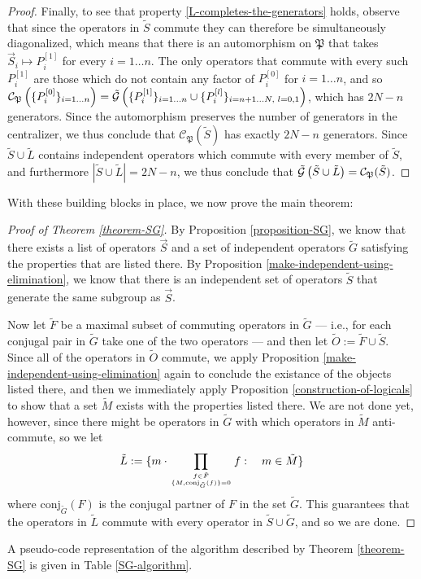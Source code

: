 \documentclass[twocolumn,showpacs,preprintnumbers,amsmath,amssymb,nofootinbib,pra,floatfix]{revtex4-1}
\newenvironment{remark}[1][Remark]{\begin{trivlist}
\item[\hskip \labelsep {\bfseries #1}]}{\end{trivlist}}
\newcommand{\lst}{\vec}
\newcommand{\set}{\tilde}
\newcommand{\genfun}{\tilde{\mathcal{G}}}
\newcommand{\pauligroup}{\mathfrak{P}}
\newcommand{\centralizer}{\mathcal{C}}
\begin{document}
\begin{proof}
Finally, to see that property \ref{L-completes-the-generators} holds, observe that since the operators in $\set S$ commute they can therefore be simultaneously diagonalized, which means that there is an automorphism on $\pauligroup$ that takes $\lst S_i\mapsto P_i^{[1]}$ for every $i=1 \dots n$.  The only operators that commute with every such $P_i^{[1]}$ are those which do not contain any factor of $P_i^{[0]}$ for $i=1 \dots n$, and so $\centralizer_\pauligroup\paren{\{P_i^{[0]}\}_{i=1\dots n}} = \genfun\paren{\{P_i^{[1]}\}_{i=1 \dots n}\cup \{P_i^{[l]}\}_{i=n+1 \dots N, \,\, l=0,1}}$, which has $2N-n$ generators.  Since the automorphism preserves the number of generators in the centralizer, we thus conclude that $\centralizer_\pauligroup(\set S)$ has exactly $2N-n$ generators.  Since $\set S\cup\set L$ contains independent operators which commute with every member of $\set S$, and furthermore $|\set S\cup\set L|=2N-n$, we thus conclude that $\genfun\paren{\set S\cup\set L}=\centralizer_\pauligroup(\set S)$.
\end{proof}
With these building blocks in place, we now prove the main theorem:

\begin{proof}[Proof of Theorem \ref{theorem-SG}]
By Proposition \ref{proposition-SG}, we know that there exists a list of operators $\lst S$ and a set of independent operators $\set G$ satisfying the properties that are listed there.  By Proposition \ref{make-independent-using-elimination}, we know that there is an independent set of operators $\set S$ that generate the same subgroup as $\lst S$.  

Now let $\set F$ be a maximal subset of commuting operators in $\set G$ --- i.e., for each conjugal pair in $\set G$ take one of the two operators --- and then let $\set O := \set F \cup \set S$.  Since all of the operators in $\set O$ commute, we apply Proposition \ref{make-independent-using-elimination} again to conclude the existance of the objects listed there, and then we immediately apply Proposition \ref{construction-of-logicals} to show that a set $\set M$ exists with the properties listed there.  We are not done yet, however, since there might be operators in $\set G$ with which operators in $\set M$ anti-commute, so we let
$$\set L := \{m\cdot\prod_{f\in \set F\atop \{M,\text{conj}_{\set G}(f)\}=0} f :\quad m \in\set M\}$$
where $\text{conj}_{\set G}(F)$ is the conjugal partner of $F$ in the set $\set G$.  This guarantees that the operators in $\set L$ commute with every operator in $\set S\cup\set G$, and so we are done.
\end{proof}
\begin{remark}
A pseudo-code representation of the algorithm described by Theorem \ref{theorem-SG} is given in Table \ref{SG-algorithm}.
\end{remark}
\end{document}
